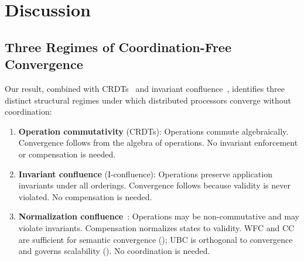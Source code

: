 \documentclass[11pt,a4paper]{article}
\theoremstyle{plain}
\theoremstyle{definition}
\theoremstyle{remark}
\renewcommand{\_}{\textunderscore\allowbreak}
\begin{document}
\section{Discussion}
\label{sec:discussion}

\subsection{Three Regimes of Coordination-Free Convergence}
\label{sec:design-space}

Our result, combined with CRDTs~\cite{shapiro2011crdt} and invariant
confluence~\cite{bailis2014coordination}, identifies three distinct structural
regimes under which distributed processors converge without coordination:

\begin{enumerate}[leftmargin=*,nosep]
\item \textbf{Operation commutativity} (CRDTs): Operations commute
  algebraically.  Convergence follows from the algebra of operations.  No
  invariant enforcement or compensation is needed.
\item \textbf{Invariant confluence} (I-confluence): Operations preserve
  application invariants under all orderings.  Convergence follows because
  validity is never violated.  No compensation is needed.
\item \textbf{Normalization confluence}~\cite{blackwell2026nc}: Operations may be
  non-commutative and may violate invariants.  Compensation normalizes states
  to validity.  WFC and CC are sufficient for semantic convergence
  (); UBC is orthogonal to convergence and governs
  scalability ().  No coordination is needed.
\end{enumerate}
\end{document}
